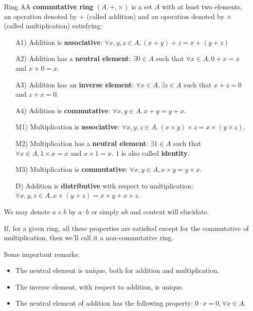 \documentclass[12pt,a4paper]{article}
\begin{document}
\begin{defn}{Ring}
AA \textbf{commutative ring} \((A, +, \times)\) is a set \(A\) with at least two elements, an operation denoted by \(+\) (called addition) and an operation denoted by \(\times\) (called multiplication) satisfying:
\begin{enumerate}
\item[A1)] Addition is \textbf{associative}: \(\forall x,y,z \in A, (x+y)+z = x+(y+z)\)
\item[A2)] Addition has a \textbf{neutral element}: \(\exists 0 \in A\) such that $\forall x \in A, 0+x = x$ and $x+0 = x$.
\item[A3)] Addition has an \textbf{inverse element}: \(\forall x \in A, \exists z \in A\) such that $x+z = 0$ and $z+x = 0$.
\item[A4)] Addition is \textbf{commutative}: \(\forall x, y \in A, x+y = y+x\).
\item[M1)] Multiplication is \textbf{associative}:  \(\forall x, y, z \in A, (x \times y) \times z = x \times (y \times z)\).
\item[M2)] Multiplication has a \textbf{neutral element}: \(\exists 1 \in A\) such that $\forall x \in A, 1 \times x = x$ and $x \times 1 = x$. $1$ is also called \textbf{identity}.
\item[M3)] Multiplication is \textbf{commutative}: \(\forall x, y \in A, x \times y = y \times x\).
\item[D)] Addition is \textbf{distributive} with respect to multiplication:  \(\forall x, y, z \in A, x \times (y + z) = x \times y + x \times z\).
\end{enumerate}

We may denote \(a \times b\) by \(a \cdot b\) or simply \(ab\) and context will elucidate.
\end{defn}

If, for a given ring, all these properties are satisfied except for the commutative of multiplication, then we'll call it a non-commutative ring.

Some important remarks:
\begin{itemize}
\item The neutral element is unique, both for addition and multiplication.
\item The inverse element, with respect to addition, is unique.
\item The neutral element of addition has the following property: \(0 \cdot x = 0, \forall x \in A\).
\end{itemize}
\end{document}
